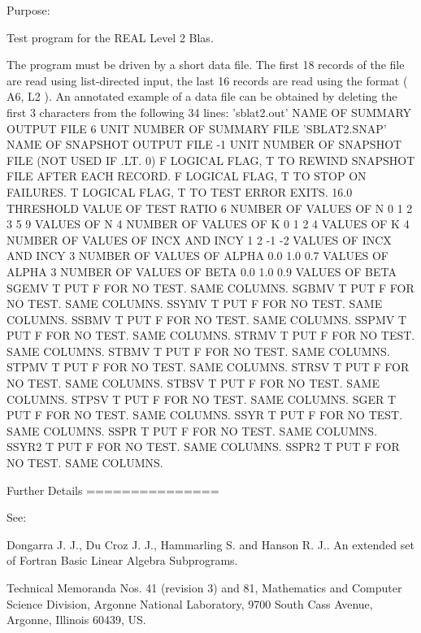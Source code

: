\begin{DoxyParagraph}{Purpose\+: }
\begin{DoxyVerb} Test program for the REAL Level 2 Blas.

 The program must be driven by a short data file. The first 18 records
 of the file are read using list-directed input, the last 16 records
 are read using the format ( A6, L2 ). An annotated example of a data
 file can be obtained by deleting the first 3 characters from the
 following 34 lines:
 'sblat2.out'      NAME OF SUMMARY OUTPUT FILE
 6                 UNIT NUMBER OF SUMMARY FILE
 'SBLAT2.SNAP'     NAME OF SNAPSHOT OUTPUT FILE
 -1                UNIT NUMBER OF SNAPSHOT FILE (NOT USED IF .LT. 0)
 F        LOGICAL FLAG, T TO REWIND SNAPSHOT FILE AFTER EACH RECORD.
 F        LOGICAL FLAG, T TO STOP ON FAILURES.
 T        LOGICAL FLAG, T TO TEST ERROR EXITS.
 16.0     THRESHOLD VALUE OF TEST RATIO
 6                 NUMBER OF VALUES OF N
 0 1 2 3 5 9       VALUES OF N
 4                 NUMBER OF VALUES OF K
 0 1 2 4           VALUES OF K
 4                 NUMBER OF VALUES OF INCX AND INCY
 1 2 -1 -2         VALUES OF INCX AND INCY
 3                 NUMBER OF VALUES OF ALPHA
 0.0 1.0 0.7       VALUES OF ALPHA
 3                 NUMBER OF VALUES OF BETA
 0.0 1.0 0.9       VALUES OF BETA
 SGEMV  T PUT F FOR NO TEST. SAME COLUMNS.
 SGBMV  T PUT F FOR NO TEST. SAME COLUMNS.
 SSYMV  T PUT F FOR NO TEST. SAME COLUMNS.
 SSBMV  T PUT F FOR NO TEST. SAME COLUMNS.
 SSPMV  T PUT F FOR NO TEST. SAME COLUMNS.
 STRMV  T PUT F FOR NO TEST. SAME COLUMNS.
 STBMV  T PUT F FOR NO TEST. SAME COLUMNS.
 STPMV  T PUT F FOR NO TEST. SAME COLUMNS.
 STRSV  T PUT F FOR NO TEST. SAME COLUMNS.
 STBSV  T PUT F FOR NO TEST. SAME COLUMNS.
 STPSV  T PUT F FOR NO TEST. SAME COLUMNS.
 SGER   T PUT F FOR NO TEST. SAME COLUMNS.
 SSYR   T PUT F FOR NO TEST. SAME COLUMNS.
 SSPR   T PUT F FOR NO TEST. SAME COLUMNS.
 SSYR2  T PUT F FOR NO TEST. SAME COLUMNS.
 SSPR2  T PUT F FOR NO TEST. SAME COLUMNS.

 Further Details
 ===============

    See:

       Dongarra J. J., Du Croz J. J., Hammarling S.  and Hanson R. J..
       An  extended  set of Fortran  Basic Linear Algebra Subprograms.

       Technical  Memoranda  Nos. 41 (revision 3) and 81,  Mathematics
       and  Computer Science  Division,  Argonne  National Laboratory,
       9700 South Cass Avenue, Argonne, Illinois 60439, US.


\end{DoxyVerb}
\end{DoxyParagraph}
